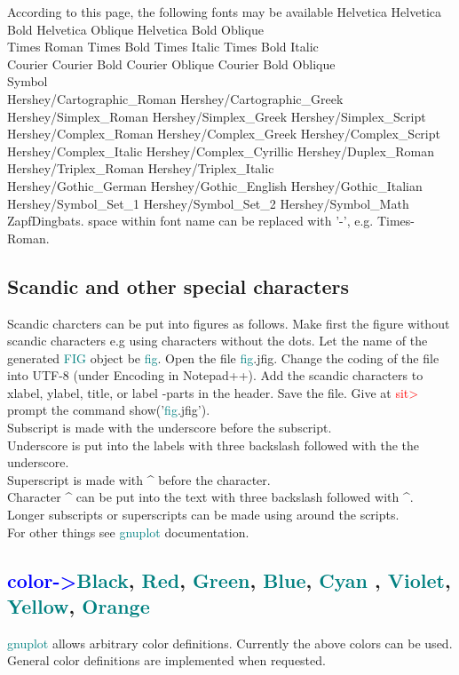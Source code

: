 According to this page, the following fonts may be available 
Helvetica 
Helvetica Bold 
Helvetica Oblique 
Helvetica Bold Oblique	 \\ 
Times Roman 
Times Bold 
Times Italic 
Times Bold Italic	 \\ 
Courier 
Courier Bold 
Courier Oblique 
Courier Bold Oblique	 \\ 
Symbol	 \\ 
Hershey/Cartographic\_Roman 
Hershey/Cartographic\_Greek 
Hershey/Simplex\_Roman 
Hershey/Simplex\_Greek 
Hershey/Simplex\_Script	\\ 
Hershey/Complex\_Roman 
Hershey/Complex\_Greek 
Hershey/Complex\_Script 
Hershey/Complex\_Italic 
Hershey/Complex\_Cyrillic 
Hershey/Duplex\_Roman 
Hershey/Triplex\_Roman 
Hershey/Triplex\_Italic	\\ 
Hershey/Gothic\_German 
Hershey/Gothic\_English 
Hershey/Gothic\_Italian 
Hershey/Symbol\_Set\_1 
Hershey/Symbol\_Set\_2 
Hershey/Symbol\_Math	 \\ 
ZapfDingbats. 
space within font name can be replaced with '-', e.g. Times-Roman. 
\subsection{Scandic and other special characters} 
\label{gnuchar} 
Scandic charcters can be put into figures as follows. Make first the figure 
without scandic characters e.g using characters without the dots. Let the name of the generated \textcolor{teal}{FIG} object be \textcolor{teal}{fig}. 
Open the file \textcolor{teal}{fig}.jfig. Change the coding of the file into UTF-8 (under Encoding in Notepad++). 
Add the scandic characters to xlabel, ylabel, title, or label -parts in the header. 
Save the file. Give at \textcolor{Red}{sit>} prompt the command \textcolor{VioletRed}{show}('\textcolor{teal}{fig}.jfig').\\ 
Subscript is made with the underscore before the subscript.\\ 
Underscore is put into the labels with three backslash followed with the the underscore.\\ 
Superscript is made with ^ before the character.\\ 
Character ^ can be put into the text with three backslash followed with ^.\\ 
Longer subscripts or superscripts can be made using {} around the scripts.\\ 
For other things see \textcolor{teal}{gnuplot} documentation. 
\subsection{\textcolor{blue}{color->}\textcolor{teal}{Black}, \textcolor{teal}{Red}, \textcolor{teal}{Green}, \textcolor{teal}{Blue}, \textcolor{teal}{Cyan} , \textcolor{teal}{Violet}, \textcolor{teal}{Yellow}, \textcolor{teal}{Orange}} 
\label{color} 
\textcolor{teal}{gnuplot} allows arbitrary color definitions. Currently the above colors can be used. 
General color definitions are implemented  when requested. 
